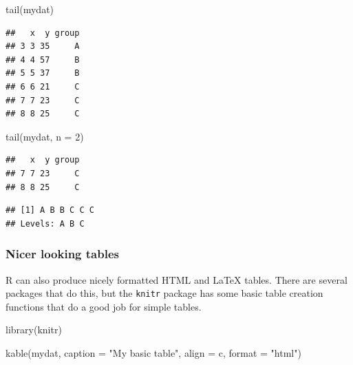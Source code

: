 \documentclass[
]{article}
\newenvironment{Shaded}{\begin{snugshade}}{\end{snugshade}}
\newcommand{\AttributeTok}[1]{\textcolor[rgb]{0.77,0.63,0.00}{#1}}
\newcommand{\DecValTok}[1]{\textcolor[rgb]{0.00,0.00,0.81}{#1}}
\newcommand{\FunctionTok}[1]{\textcolor[rgb]{0.00,0.00,0.00}{#1}}
\newcommand{\NormalTok}[1]{#1}
\newcommand{\SpecialCharTok}[1]{\textcolor[rgb]{0.00,0.00,0.00}{#1}}
\newcommand{\StringTok}[1]{\textcolor[rgb]{0.31,0.60,0.02}{#1}}
\begin{document}
\begin{Shaded}
\begin{Highlighting}[]
\FunctionTok{tail}\NormalTok{(mydat)}
\end{Highlighting}
\end{Shaded}

\begin{verbatim}
##   x  y group
## 3 3 35     A
## 4 4 57     B
## 5 5 37     B
## 6 6 21     C
## 7 7 23     C
## 8 8 25     C
\end{verbatim}

\begin{Shaded}
\begin{Highlighting}[]
\FunctionTok{tail}\NormalTok{(mydat, }\AttributeTok{n =} \DecValTok{2}\NormalTok{)}
\end{Highlighting}
\end{Shaded}

\begin{verbatim}
##   x  y group
## 7 7 23     C
## 8 8 25     C
\end{verbatim}

\begin{Shaded}
\end{Shaded}

\begin{verbatim}
## [1] A B B C C C
## Levels: A B C
\end{verbatim}

\hypertarget{nicer-looking-tables}{%
\subsubsection{Nicer looking tables}\label{nicer-looking-tables}}

R can also produce nicely formatted HTML and LaTeX tables. There are
several packages that do this, but the \texttt{knitr} package has some basic
table creation functions that do a good job for simple tables.

\begin{Shaded}
\begin{Highlighting}[]
\FunctionTok{library}\NormalTok{(knitr)}

\FunctionTok{kable}\NormalTok{(mydat,}
      \AttributeTok{caption =} \StringTok{"My basic table"}\NormalTok{,}
      \AttributeTok{align =} \StringTok{\textquotesingle{}c\textquotesingle{}}\NormalTok{,  }
      \AttributeTok{format =} \StringTok{"html"}\NormalTok{)}
\end{Highlighting}
\end{Shaded}
\end{document}
